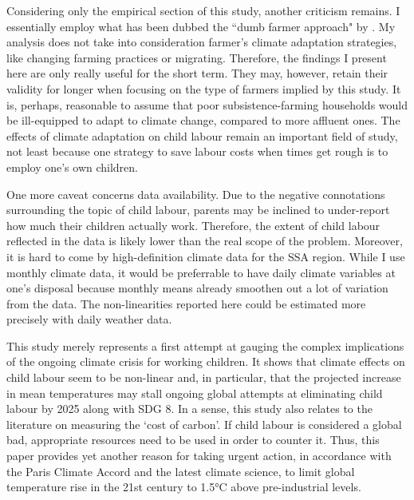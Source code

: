 \documentclass[a4paper,12pt]{article}
\theoremstyle{plain}
\theoremstyle{definition}
\theoremstyle{definition}
\theoremstyle{definition}
\theoremstyle{definition}
\begin{document}
Considering only the empirical section of this study, another criticism remains. I essentially employ what has been dubbed the ``dumb farmer approach" by \citet{Auffhammer2014}. My analysis does not take into consideration farmer's climate adaptation strategies, like changing farming practices or migrating. Therefore, the findings I present here are only really useful for the short term. They may, however, retain their validity for longer when focusing on the type of farmers implied by this study. It is, perhaps, reasonable to assume that poor subsistence-farming households would be ill-equipped to adapt to climate change, compared to more affluent ones. The effects of climate adaptation on child labour remain an important field of study, not least because one strategy to save labour costs when times get rough is to employ one's own children.

One more caveat concerns data availability. Due to the negative connotations surrounding the topic of child labour, parents may be inclined to under-report how much their children actually work. Therefore, the extent of child labour reflected in the data is likely lower than the real scope of the problem. Moreover, it is hard to come by high-definition climate data for the SSA region. While I use monthly climate data, it would be preferrable to have daily climate variables at one's disposal because monthly means already smoothen out a lot of variation from the data. The non-linearities reported here could be estimated more precisely with daily weather data. 

This study merely represents a first attempt at gauging the complex implications of the ongoing climate crisis for working children. It shows that climate effects on child labour seem to be non-linear and, in particular, that the projected increase in mean temperatures may stall ongoing global attempts at eliminating child labour by 2025 along with SDG 8. In a sense, this study also relates to the literature on measuring the `cost of carbon'. If child labour is considered a global bad, appropriate resources need to be used in order to counter it. Thus, this paper provides yet another reason for taking urgent action, in accordance with the Paris Climate Accord and the latest climate science, to limit global temperature rise in the 21st century to 1.5°C above pre-industrial levels.

\newpage
\small


\end{document}
